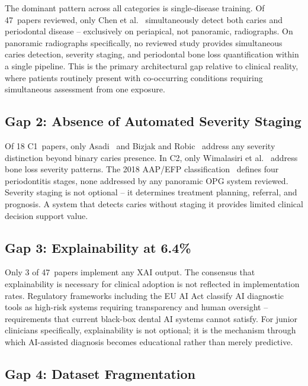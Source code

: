 \documentclass[conference]{IEEEtran}
\begin{document}
The dominant pattern across all categories is single-disease training.
Of 47~papers reviewed, only Chen et al.~\cite{chen2023deep}
simultaneously detect both caries and periodontal disease -- exclusively
on periapical, not panoramic, radiographs. On panoramic radiographs
specifically, no reviewed study provides simultaneous caries detection,
severity staging, and periodontal bone loss quantification within a
single pipeline. This is the primary architectural gap relative to
clinical reality, where patients routinely present with co-occurring
conditions requiring simultaneous assessment from one exposure.

\subsection{Gap 2: Absence of Automated Severity Staging}

Of 18 C1~papers, only Asadi~\cite{asadi2024detection} and Bizjak and
Robic~\cite{bizjak2024advancing} address any severity distinction beyond
binary caries presence. In C2, only Wimalasiri et
al.~\cite{wimalasiri2025ai} address bone loss severity patterns. The
2018 AAP/EFP classification~\cite{chmielewski20252018} defines four
periodontitis stages, none addressed by any panoramic OPG system
reviewed. Severity staging is not optional -- it determines treatment
planning, referral, and prognosis. A system that detects caries without
staging it provides limited clinical decision support value.

\subsection{Gap 3: Explainability at 6.4\%}

Only 3 of 47~papers implement any XAI output. The consensus that
explainability is necessary for clinical adoption
\cite{nassiri2025yolo,gamal2025automated,sastika2025ai,ferrara2025applications}
is not reflected in implementation rates. Regulatory frameworks including
the EU AI Act classify AI diagnostic tools as high-risk systems requiring
transparency and human oversight -- requirements that current black-box
dental AI systems cannot satisfy. For junior clinicians specifically,
explainability is not optional; it is the mechanism through which
AI-assisted diagnosis becomes educational rather than merely predictive.

\subsection{Gap 4: Dataset Fragmentation}
\end{document}
